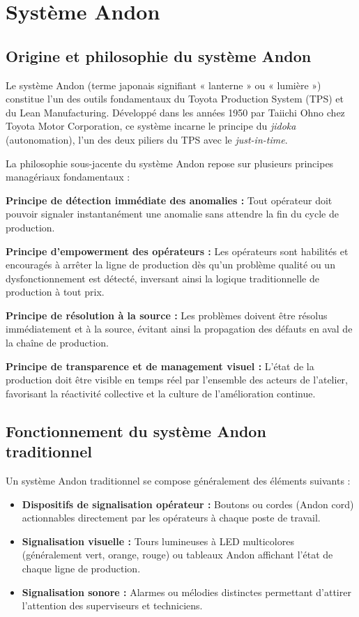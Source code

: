 \section{Système Andon}

\subsection{Origine et philosophie du système Andon}

Le système Andon (terme japonais signifiant « lanterne » ou « lumière ») constitue l'un des outils fondamentaux du Toyota Production System (TPS) et du Lean Manufacturing. Développé dans les années 1950 par Taiichi Ohno chez Toyota Motor Corporation, ce système incarne le principe du \textit{jidoka} (autonomation), l'un des deux piliers du TPS avec le \textit{just-in-time}.

La philosophie sous-jacente du système Andon repose sur plusieurs principes managériaux fondamentaux :

\textbf{Principe de détection immédiate des anomalies :} Tout opérateur doit pouvoir signaler instantanément une anomalie sans attendre la fin du cycle de production.

\textbf{Principe d'empowerment des opérateurs :} Les opérateurs sont habilités et encouragés à arrêter la ligne de production dès qu'un problème qualité ou un dysfonctionnement est détecté, inversant ainsi la logique traditionnelle de production à tout prix.

\textbf{Principe de résolution à la source :} Les problèmes doivent être résolus immédiatement et à la source, évitant ainsi la propagation des défauts en aval de la chaîne de production.

\textbf{Principe de transparence et de management visuel :} L'état de la production doit être visible en temps réel par l'ensemble des acteurs de l'atelier, favorisant la réactivité collective et la culture de l'amélioration continue.

\subsection{Fonctionnement du système Andon traditionnel}

Un système Andon traditionnel se compose généralement des éléments suivants :

\begin{itemize}
    \item \textbf{Dispositifs de signalisation opérateur :} Boutons ou cordes (Andon cord) actionnables directement par les opérateurs à chaque poste de travail.
    
    \item \textbf{Signalisation visuelle :} Tours lumineuses à LED multicolores (généralement vert, orange, rouge) ou tableaux Andon affichant l'état de chaque ligne de production.
    
    \item \textbf{Signalisation sonore :} Alarmes ou mélodies distinctes permettant d'attirer l'attention des superviseurs et techniciens.
\end{itemize}


